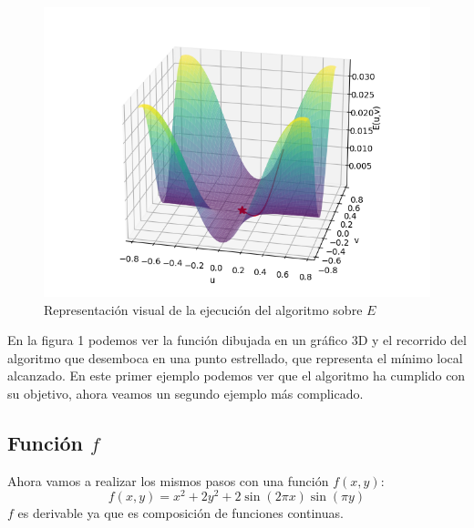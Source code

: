 \documentclass{article}
\begin{document}
    \pagebreak
    \begin{figure}[h] \label{fig1}
        \caption{Representación visual de la ejecución del algoritmo sobre $E$}
        \centering
        \includegraphics[width=\textwidth]{Figure_1.png}
    \end{figure}
    En la figura 1 podemos ver la función dibujada en un gráfico 3D y el recorrido del algoritmo
    que desemboca en una punto estrellado, que representa el mínimo local alcanzado.
    En este primer ejemplo podemos ver que el algoritmo ha cumplido con su objetivo, ahora veamos un
    segundo ejemplo más complicado.

    \pagebreak

    \subsection{Función $f$}
    Ahora vamos a realizar los mismos pasos con una función $f(x,y):$
    \begin{equation*}
        f(x,y) = x^2 + 2y^2 + 2 \sin{(2 \pi x)}\sin{(\pi y)}
    \end{equation*}
    $f$ es derivable ya que es composición de funciones continuas.
\end{document}
